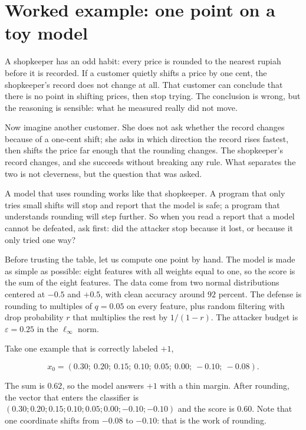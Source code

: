 \section{Worked example: one point on a toy model}

\begin{untukanak}
A shopkeeper has an odd habit: every price is rounded to the nearest rupiah
before it is recorded. If a customer quietly shifts a price by one cent,
the shopkeeper's record does not change at all. That customer can conclude that there is no
point in shifting prices, then stop trying. The conclusion is wrong, but
the reasoning is sensible: what he measured really did not move.

Now imagine another customer. She does not ask whether the record changes because of a one-cent
shift; she asks in which direction the record rises fastest, then shifts the
price far enough that the rounding changes. The shopkeeper's record changes, and
she succeeds without breaking any rule. What separates the two is not cleverness,
but the question that was asked.

A model that uses rounding works like that shopkeeper. A program that only tries
small shifts will stop and report that the model is safe; a program that understands
rounding will step further. So when you read a report that a model
cannot be defeated, ask first: did the attacker stop because it lost, or because it
only tried one way?
\end{untukanak}

Before trusting the table, let us compute one point by hand. The model is made as
simple as possible: eight features with all weights equal to one, so the score is the
sum of the eight features. The data come from two normal distributions centered at $-0.5$ and
$+0.5$, with clean accuracy around $92$ percent. The defense is rounding to
multiples of $q=0.05$ on every feature, plus random filtering with drop probability $r$
that multiplies the rest by $1/(1-r)$. The attacker budget is $\varepsilon=0.25$ in the
$\ell_\infty$ norm.

Take one example that is correctly labeled $+1$,

\begin{equation}
x_0 = (0.30;\ 0.20;\ 0.15;\ 0.10;\ 0.05;\ 0.00;\ -0.10;\ -0.08).
\end{equation}

The sum is $0.62$, so the model answers $+1$ with a thin margin. After
rounding, the vector that enters the classifier is
$(0.30;0.20;0.15;0.10;0.05;0.00;-0.10;-0.10)$ and the score is $0.60$.
Note that one coordinate shifts from $-0.08$ to $-0.10$: that is the work of
rounding.

